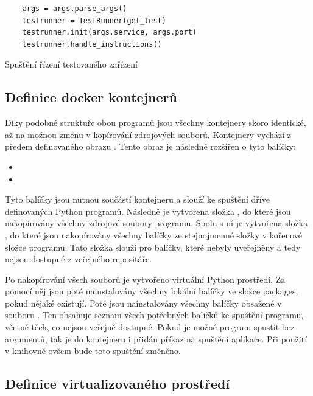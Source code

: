 \begin{listing}[htbp]
    \centering
    \begin{verbatim}
    args = args.parse_args()
    testrunner = TestRunner(get_test)
    testrunner.init(args.service, args.port)
    testrunner.handle_instructions()
    \end{verbatim}
\caption{Spuštění řízení testovaného zařízení}
\label{listing:server_main}
\end{listing}


\subsection{Definice docker kontejnerů}

Díky podobné struktuře obou programů jsou všechny kontejnery skoro identické, až na možnou změnu v kopírování zdrojových souborů. Kontejnery vychází z předem definovaného obrazu . Tento obraz je následně rozšířen o tyto balíčky:

\begin{itemize}
    \item {}
    \item {}
\end{itemize}

Tyto balíčky jsou nutnou součástí kontejneru a slouží ke spuštění dříve definovaných Python programů. Následně je vytvořena složka , do které jsou nakopírovány všechny zdrojové soubory programu. Spolu s ní je vytvořena složka , do které jsou nakopírovány všechny balíčky ze stejnojmenné složky v kořenové složce programu. Tato složka slouží pro balíčky, které nebyly uveřejněny a tedy nejsou dostupné z veřejného repositáře.

Po nakopírování všech souborů je vytvořeno virtuální Python prostředí. Za pomocí něj jsou poté nainstalovány všechny lokální balíčky ve složce packages, pokud nějaké existují. Poté jsou nainstalovány všechny balíčky obsažené v souboru . Ten obsahuje seznam všech potřebných balíčků ke spuštění programu, včetně těch, co nejsou veřejně dostupné. Pokud je možné program spustit bez argumentů, tak je do kontejneru i přidán příkaz na spuštění aplikace. Při použití v knihovně ovšem bude toto spuštění změněno. 

\subsection{Definice virtualizovaného prostředí}

